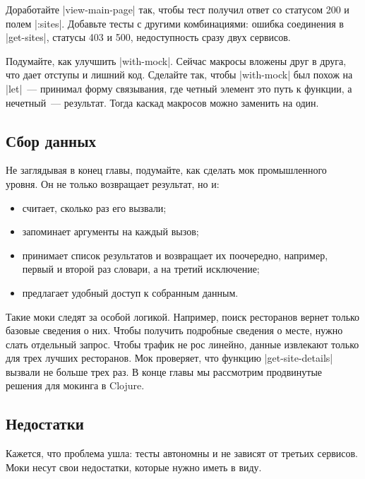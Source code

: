 Доработайте \spverb|view-main-page| так, чтобы тест получил ответ со статусом
200 и полем \spverb|:sites|. Добавьте тесты с другими комбинациями: ошибка
соединения в \spverb|get-sites|, статусы 403 и 500, недоступность сразу двух
сервисов.

Подумайте, как улучшить \spverb|with-mock|. Сейчас макросы вложены друг в друга,
что дает отступы и лишний код. Сделайте так, чтобы \spverb|with-mock| был похож
на \spverb|let|~--- принимал форму связывания, где четный элемент это путь к
функции, а нечетный~--- результат. Тогда каскад макросов можно заменить на один.

\subsection{Сбор данных}

Не заглядывая в конец главы, подумайте, как сделать мок промышленного уровня. Он
не только возвращает результат, но и:

\begin{itemize}

\item
  считает, сколько раз его вызвали;

\item
  запоминает аргументы на каждый вызов;

\item
  принимает список результатов и возвращает их поочередно, например, первый и
  второй раз словари, а на третий исключение;

\item
  предлагает удобный доступ к собранным данным.

\end{itemize}

Такие моки следят за особой логикой. Например, поиск ресторанов вернет только
базовые сведения о них. Чтобы получить подробные сведения о месте, нужно слать
отдельный запрос. Чтобы трафик не рос линейно, данные извлекают только для трех
лучших ресторанов. Мок проверяет, что функцию \spverb|get-site-details| вызвали
не больше трех раз. В конце главы мы рассмотрим продвинутые решения для мокинга
в Clojure.

\subsection{Недостатки}

Кажется, что проблема ушла: тесты автономны и не зависят от третьих
сервисов. Моки несут свои недостатки, которые нужно иметь в виду.

